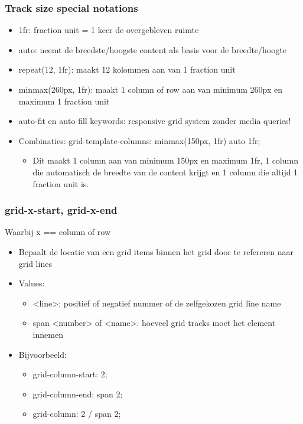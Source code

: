 \documentclass{article}
\begin{document}
\subsubsection{Track size special notations}

\begin{itemize}
    \item 1fr: fraction unit = 1 keer de overgebleven ruimte
    \item auto: neemt de breedste/hoogste content als basis voor de breedte/hoogte
    \item repeat(12, 1fr): maakt 12 kolommen aan van 1 fraction unit
    \item minmax(260px, 1fr): maakt 1 column of row aan van minimum 260px en maximum 1 fraction unit
    \item auto-fit en auto-fill keywords: responsive grid system zonder media queries!
    \item Combinaties: grid-template-columns: minmax(150px, 1fr) auto 1fr;
    \begin{itemize}
        \item Dit maakt 1 column aan van minimum 150px en maximum 1fr, 1 column die automatisch de breedte van de content krijgt en 1 column die altijd 1 fraction unit is.
    \end{itemize}
\end{itemize}

\subsubsection{grid-x-start, grid-x-end}
Waarbij x == column of row

\begin{itemize}
    \item Bepaalt de locatie van een grid items binnen het grid door te refereren naar grid lines
    \item Values:
    \begin{itemize}
        \item <line>: positief of negatief nummer of de zelfgekozen grid line name
        \item span <number> of <name>: hoeveel grid tracks moet het element innemen
    \end{itemize}
    \item Bijvoorbeeld: 
    \begin{itemize}
        \item grid-column-start: 2;
        \item grid-column-end: span 2;
        \item grid-column: 2 / span 2;
    \end{itemize}
\end{itemize}
\end{document}
